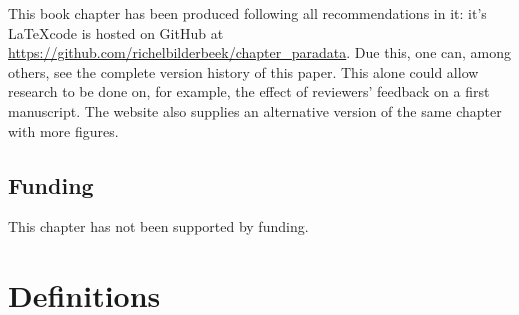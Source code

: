 This book chapter has been produced following all recommendations in it:
it's \LaTeX code is hosted on GitHub 
at \url{https://github.com/richelbilderbeek/chapter_paradata}.
Due this, one can, among others, see the complete version history of this paper.
This alone could allow research to be done on, for example,
the effect of reviewers' feedback on a first manuscript.
The website also supplies an alternative version of the same chapter
with more figures.

\subsection{Funding}

This chapter has not been supported by funding.

\section*{Definitions}

